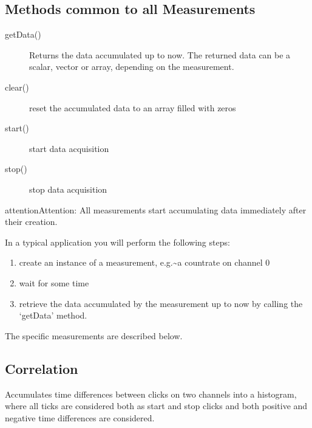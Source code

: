 \documentclass[letterpaper,10pt,english]{sphinxmanual}
\begin{document}
\subsection{Methods common to all Measurements}
\label{sections/api:methods-common-to-all-measurements}\begin{description}
\item[{getData()}] \leavevmode
Returns the data accumulated up to now. The returned data can be a scalar, vector or array,
depending on the measurement.

\item[{clear()}] \leavevmode
reset the accumulated data to an array filled with zeros

\item[{start()}] \leavevmode
start data acquisition

\item[{stop()}] \leavevmode
stop data acquisition

\end{description}

\begin{notice}{attention}{Attention:}
All measurements start accumulating data immediately after their creation.
\end{notice}

In a typical application you will perform the following steps:
\begin{enumerate}
\item {} 
create an instance of a measurement, e.g.\textasciitilde{}a countrate on channel 0

\item {} 
wait for some time

\item {} 
retrieve the data accumulated by the measurement up to now by calling the `getData' method.

\end{enumerate}

The specific measurements are described below.


\subsection{Correlation}
\label{sections/api:correlation}
Accumulates time differences between clicks on two channels into
a histogram, where all ticks are considered both as start and stop
clicks and both positive and negative time differences are considered.
\end{document}
